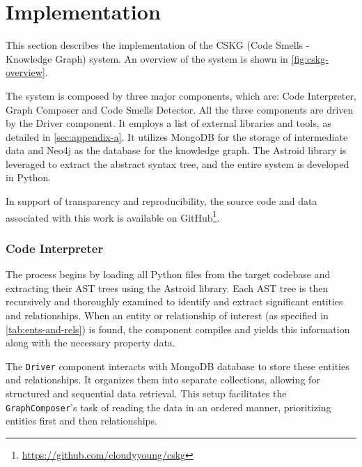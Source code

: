 \section{Implementation}
\label{sec:imple}

This section describes the implementation of the CSKG (Code Smells - Knowledge Graph) system. An overview of the system is shown in \autoref{fig:cskg-overview}. 

The system is composed by three major components, which are: Code Interpreter, Graph Composer and Code Smells Detector. All the three components are driven by the Driver component. It employs a list of external libraries and tools, as detailed in \autoref{sec:appendix-a}. It utilizes MongoDB for the storage of intermediate data and Neo4j as the database for the knowledge graph. The Astroid library is leveraged to extract the abstract syntax tree, and the entire system is developed in Python.

In support of transparency and reproducibility, the source code and data associated with this work is available on GitHub\footnote{\url{https://github.com/cloudyyoung/cskg}}.


\subsubsection{Code Interpreter}

The process begins by loading all Python files from the target codebase and extracting their AST trees using the Astroid library. Each AST tree is then recursively and thoroughly examined to identify and extract significant entities and relationships. When an entity or relationship of interest (as specified in \autoref{tab:ents-and-rels}) is found, the component compiles and yields this information along with the necessary property data.

The \texttt{Driver} component interacts with MongoDB database to store these entities and relationships. It organizes them into separate collections, allowing for structured and sequential data retrieval. This setup facilitates the \texttt{GraphComposer}'s task of reading the data in an ordered manner, prioritizing entities first and then relationships.




